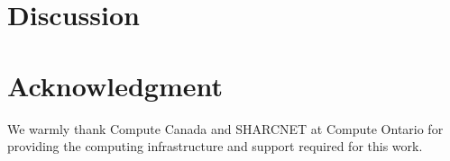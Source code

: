 \documentclass[11pt]{IEEEtran}
\begin{document}




\section{Discussion}










\section{Acknowledgment}

We warmly thank Compute Canada and SHARCNET at Compute Ontario for
providing the computing infrastructure and support required for this work. 
\end{document}
